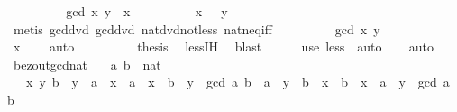 \begin{isabellebody}
\ \ \ \ \ \ \isamarkupfalse%
\ \isamarkupfalse%
\ {\isachardoublequoteopen}gcd\ x\ y\ {\isacharless}{\kern0pt}\ x{\isachardoublequoteclose}\isanewline
\ \ \ \ \ \ \ \ \isamarkupfalse%
\ {\isacartoucheopen}x\ {\isachargreater}{\kern0pt}\ {}{\isacartoucheclose}\ y\ \isamarkupfalse%
\ {\isacharparenleft}{\kern0pt}metis\ gcd{\isacharunderscore}{\kern0pt}dvd{}\ gcd{\isacharunderscore}{\kern0pt}dvd{}\ nat{\isacharunderscore}{\kern0pt}dvd{\isacharunderscore}{\kern0pt}not{\isacharunderscore}{\kern0pt}less\ nat{\isacharunderscore}{\kern0pt}neq{\isacharunderscore}{\kern0pt}iff{\isacharparenright}{\kern0pt}\isanewline
\ \ \ \ \ \ \isamarkupfalse%
\ \isamarkupfalse%
\ {\isachardoublequoteopen}gcd\ x\ y\ {\isachargreater}{\kern0pt}\ {}{\isachardoublequoteclose}\isanewline
\ \ \ \ \ \ \ \ \isamarkupfalse%
\ {\isacartoucheopen}x\ {\isachargreater}{\kern0pt}\ {}{\isacartoucheclose}\ \isamarkupfalse%
\ auto\isanewline
\ \ \ \ \ \ \isamarkupfalse%
\ \isamarkupfalse%
\ {\isacharquery}{\kern0pt}thesis\ \isamarkupfalse%
\ less{\isachardot}{\kern0pt}IH\ \isamarkupfalse%
\ blast\isanewline
\ \ \ \ \isamarkupfalse%
\ {\isacharparenleft}{\kern0pt}use\ less\ \ auto{\isacharparenright}{\kern0pt}\isanewline
\ \ \isamarkupfalse%
\isanewline
{}\isamarkupfalse%
\ auto%
\endisatagproof
{\isafoldproof}%
%
\isadelimproof
\isanewline
%
\endisadelimproof
\isanewline
{}\isamarkupfalse%
\ bezout{\isacharunderscore}{\kern0pt}gcd{\isacharunderscore}{\kern0pt}nat{\isacharprime}{\kern0pt}{\isacharcolon}{\kern0pt}\isanewline
\ \ \ a\ b\ {\isacharcolon}{\kern0pt}{\isacharcolon}{\kern0pt}\ nat\isanewline
\ \ \ {\isachardoublequoteopen}{\isasymexists}x\ y{\isachardot}{\kern0pt}\ b\ {\isacharasterisk}{\kern0pt}\ y\ {\isasymle}\ a\ {\isacharasterisk}{\kern0pt}\ x\ {\isasymand}\ a\ {\isacharasterisk}{\kern0pt}\ x\ {\isacharminus}{\kern0pt}\ b\ {\isacharasterisk}{\kern0pt}\ y\ {\isacharequal}{\kern0pt}\ gcd\ a\ b\ {\isasymor}\ a\ {\isacharasterisk}{\kern0pt}\ y\ {\isasymle}\ b\ {\isacharasterisk}{\kern0pt}\ x\ {\isasymand}\ b\ {\isacharasterisk}{\kern0pt}\ x\ {\isacharminus}{\kern0pt}\ a\ {\isacharasterisk}{\kern0pt}\ y\ {\isacharequal}{\kern0pt}\ gcd\ a\ b{\isachardoublequoteclose}\isanewline
%
\isadelimproof
\ \ %
\endisadelimproof

\end{isabellebody}
